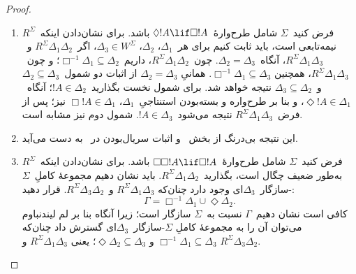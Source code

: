 \documentclass[../../../include/open-logic-section]{subfiles}
\begin{document}
\begin{proof}
  \begin{enumerate}
  \item فرض کنید~$\Sigma$ شامل طرح‌وارهٔ~$\Diamond !A \lif
    \Box !A$ باشد. برای نشان‌دادن اینکه~$R^\Sigma$ نیمه‌تابعی است،
    باید ثابت کنیم برای هر~$\Delta_1$، $\Delta_2$، $\Delta_3 \in
    W^\Sigma$، اگر~$R^\Sigma \Delta_1\Delta_2$ و~$R^\Sigma
    \Delta_1\Delta_3$، آنگاه~$\Delta_2=\Delta_3$. چون~$R^\Sigma
    \Delta_1\Delta_2$، داریم~$\Box^{-1}\Delta_1 \subseteq \Delta_2$؛
    و چون~$R^\Sigma \Delta_1\Delta_3$، همچنین
    $\Box^{-1}\Delta_1 \subseteq \Delta_3$. همانیِ
    $\Delta_2=\Delta_3$ از اثبات دو شمول~$\Delta_2 \subseteq
    \Delta_3$ و~$\Delta_3 \subseteq \Delta_2$ نتیجه خواهد شد. برای
    شمول نخست بگذارید~$!A \in \Delta_2$؛ آنگاه~$\Diamond!A \in
    \Delta_1$، و بنا بر طرح‌واره و بسته‌بودن استنتاجیِ~$\Delta_1$،
    $\Box!A \in \Delta_1$ نیز؛ پس از فرض~$R^\Sigma
    \Delta_1\Delta_3$ نتیجه می‌شود~$!A \in \Delta_3$. شمول دوم نیز
    مشابه است.

  \item این نتیجه بی‌درنگ از بخش~ و اثبات
    سریال‌بودن در~ به دست می‌آید.

  \item فرض کنید~$\Sigma$ شامل طرح‌وارهٔ~$\Box\Box!A \lif \Box!A$
    باشد. برای نشان‌دادن اینکه~$R^\Sigma$ به‌طور ضعیف چگال است،
    بگذارید~$R^\Sigma \Delta_1\Delta_2$. باید نشان دهیم مجموعهٔ
    کاملِ~$\Sigma$-سازگار~$\Delta_3$ای وجود دارد چنان‌که
    $R^\Sigma \Delta_1\Delta_3$ و~$R^\Sigma \Delta_3\Delta_2$. قرار
    دهید:
    \[
    \Gamma = \Box^{-1}\Delta_1 \cup \Diamond\Delta_2.
    \]
    کافی است نشان دهیم~$\Gamma$ نسبت به~$\Sigma$ سازگار است؛ زیرا
    آنگاه بنا بر لم لیندنباوم می‌توان آن را به مجموعهٔ کاملِ
    $\Sigma$-سازگار~$\Delta_3$ای گسترش داد چنان‌که
    $\Box^{-1}\Delta_1 \subseteq \Delta_3$ و
    $\Diamond\Delta_2 \subseteq \Delta_3$؛ یعنی
    $R^\Sigma \Delta_1\Delta_3$ و
    $R^\Sigma \Delta_3\Delta_2$.


\end{enumerate}
\end{proof}
\end{document}
